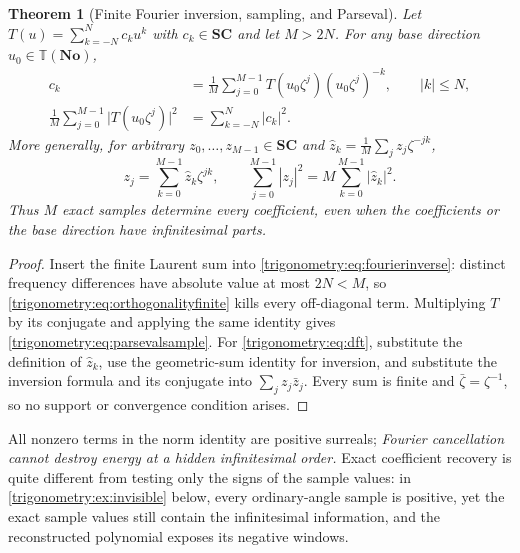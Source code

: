 \documentclass[11pt,letterpaper]{article}
\numberwithin{equation}{section}
\newtheorem{theorem}{Theorem}[section]
\theoremstyle{definition}
\theoremstyle{remark}
\newcommand{\No}{\mathbf{No}}
\newcommand{\SC}{\mathbf{SC}}
\newcommand{\TT}{\mathbb T}
\begin{document}
\begin{theorem}[Finite Fourier inversion, sampling, and Parseval]\label{trigonometry:thm:fourier}
Let $T(u)=\sum_{k=-N}^Nc_ku^k$ with $c_k\in\SC$ and let $M>2N$. For \emph{any} base direction
$u_0\in\TT(\No)$,
\begin{align}
 c_k&=\frac1M\sum_{j=0}^{M-1}T(u_0\zeta^j)(u_0\zeta^j)^{-k},\qquad|k|\le N,
 \label{trigonometry:eq:fourierinverse}\\
 \frac1M\sum_{j=0}^{M-1}\bigl|T(u_0\zeta^j)\bigr|^2&=\sum_{k=-N}^N|c_k|^2 .
 \label{trigonometry:eq:parsevalsample}
\end{align}
More generally, for arbitrary $z_0,\dots,z_{M-1}\in\SC$ and
$\widehat z_k=\frac1M\sum_jz_j\zeta^{-jk}$,
\begin{equation}\label{trigonometry:eq:dft}
 z_j=\sum_{k=0}^{M-1}\widehat z_k\zeta^{jk},\qquad
 \sum_{j=0}^{M-1}|z_j|^2=M\sum_{k=0}^{M-1}|\widehat z_k|^2 .
\end{equation}
Thus $M$ exact samples determine every coefficient, even when the coefficients or the base
direction have infinitesimal parts.
\end{theorem}
\begin{proof}
Insert the finite Laurent sum into \cref{trigonometry:eq:fourierinverse}: distinct frequency
differences have absolute value at most $2N<M$, so \cref{trigonometry:eq:orthogonalityfinite} kills
every off-diagonal term. Multiplying $T$ by its conjugate and applying the same identity gives
\cref{trigonometry:eq:parsevalsample}. For \cref{trigonometry:eq:dft}, substitute the definition of
$\widehat z_k$, use the geometric-sum identity for inversion, and substitute the inversion formula
and its conjugate into $\sum_jz_j\bar z_j$. Every sum is finite and $\bar\zeta=\zeta^{-1}$, so no
support or convergence condition arises.
\end{proof}
All nonzero terms in the norm identity are positive surreals; \emph{Fourier cancellation cannot
destroy energy at a hidden infinitesimal order.} Exact coefficient recovery is quite different from
testing only the signs of the sample values: in \cref{trigonometry:ex:invisible} below, every
ordinary-angle sample is positive, yet the exact sample values still contain the infinitesimal
information, and the reconstructed polynomial exposes its negative windows.
\end{document}
